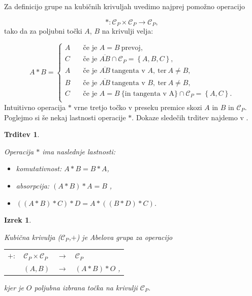 \documentclass[12pt,a4paper,twoside]{article}
\theoremstyle{definition} %
\theoremstyle{plain} %
\newtheorem{izrek}[definicija]{Izrek}
\newtheorem{trditev}[definicija]{Trditev}
\numberwithin{equation}{section}  %
\begin{document}
Za definicijo grupe na kubičnih krivuljah uvedimo najprej pomožno operacijo

$$\ast : \mathcal{C}_P \times \mathcal{C}_P \rightarrow \mathcal{C}_P,$$
tako da za poljubni točki $A$, $B$ na krivulji velja:

\[ A \ast B =
\begin{cases}
A & \quad \text{če je } A=B \ \text{prevoj},\\
C & \quad \text{če je } \overline{AB} \cap \mathcal{C}_P = \left\{ A,B,C \right\},\\
A & \quad \text{če je } \overline{AB} \ \text{tangenta v } A,\ \text{ter} \ A \neq B,\\
B & \quad \text{če je } \overline{AB} \ \text{tangenta v } B,\ \text{ter} \ A \neq B,\\
C &\quad \text{če je } A=B \ \{\text{in tangenta v A}\} \cap \mathcal{C}_P = \left\{ A,C \right\}.\\
\end{cases}
\]
Intuitivno operacija $\ast$ vrne tretjo točko v preseku premice skozi $A$ in $B$ in $\mathcal{C}_P$. Poglejmo si še nekaj lastnosti operacije $\ast$. Dokaze sledečih trditev najdemo v \cite[Poglavje 17.3]{gibson}.

\begin{trditev}~

\label{last zvezda}
Operacija $\ast$ ima naslednje lastnosti:

\begin{itemize}
\item komutativnost: $ A \ast B = B \ast A$,
\item absorpcija: $(A \ast B ) \ast A = B$ ,
\item $((A \ast B) \ast C ) \ast D = A \ast ((B \ast D)\ast C)$.
\end{itemize}
\end{trditev}

\begin{izrek}~

Kubična krivulja ($\mathcal{C}_P$,$+$) je Abelova grupa za operacijo

\begin{table}[ht]
\centering
\begin{tabular}{llll}
$+:$ & $\mathcal{C}_P \times \mathcal{C}_P$ & $\rightarrow$ & $\mathcal{C}_P$ \\
& $(A,B)$ & $\rightarrow$ & $(A\ast B)\ast O$ ,
\end{tabular}
\end{table}
kjer je $O$ poljubna izbrana točka na krivulji $ \mathcal{C}_P$.
\end{izrek}
\end{document}
